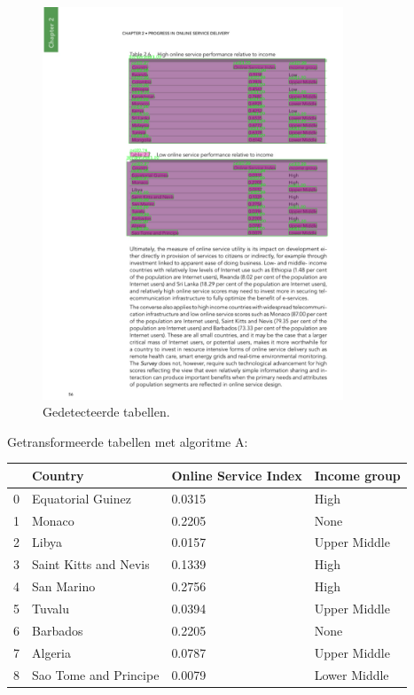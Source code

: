 \begin{figure}[H]
    \centering
    \includegraphics[width=0.8\textwidth]{test-resultaten/12/detected_tables.png}
    \caption{Gedetecteerde tabellen.}
\end{figure}

Getransformeerde tabellen met algoritme A:

\begin{tabular}{llll}
\toprule
{} &                Country & Online Service Index &  Income group \\
\midrule
0 &      Equatorial Guinez &               0.0315 &          High \\
1 &                 Monaco &               0.2205 &          None \\
2 &                  Libya &               0.0157 &  Upper Middle \\
3 &  Saint Kitts and Nevis &               0.1339 &          High \\
4 &             San Marino &               0.2756 &          High \\
5 &                 Tuvalu &               0.0394 &  Upper Middle \\
6 &               Barbados &               0.2205 &          None \\
7 &                Algeria &               0.0787 &  Upper Middle \\
8 &  Sao Tome and Principe &               0.0079 &  Lower Middle \\
\bottomrule
\end{tabular}

